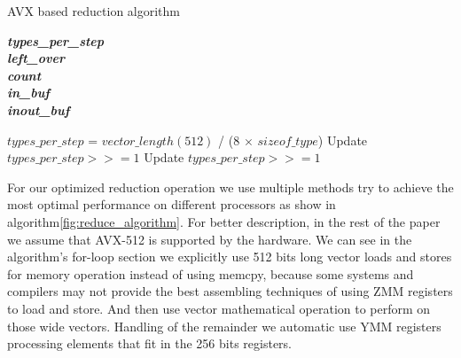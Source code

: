 \documentclass[sigconf,review]{acmart}
\begin{document}
\begin{algorithm}[t]
\caption{AVX based reduction algorithm}\label{fig:reduce_algorithm}

\textbf{\textit{types\_per\_step}} \\
\textbf{\textit{left\_over}} \\
\textbf{\textit{count}} \\
\textbf{\textit{in\_buf}} \\
\textbf{\textit{inout\_buf}} \\

\begin{algorithmic}[1]
  \State $types\_per\_step$ = $vector\_length (512)$ / ($8$ $\times$ $sizeof\_type$)
{}
\EndFor
{}
  \State Update $types\_per\_step >>= 1$
    \EndIf
\EndIf
{}
  \State Update $types\_per\_step >>= 1$
    \EndIf
\EndIf
{}
\EndIf
\EndProcedure
\end{algorithmic}
\end{algorithm}

%
For our optimized reduction operation we use multiple methods try to achieve the
most optimal performance on different processors as show in algorithm\ref{fig:reduce_algorithm}.
For better description, in the rest of the paper we assume that AVX-512 is supported by the hardware.
We can see in the algorithm's for-loop section we explicitly use 512 bits long vector loads and stores
for memory operation instead of using memcpy, because some systems and compilers
may not provide the best assembling techniques of using ZMM registers to load
and store. And then use vector mathematical operation to perform on those wide vectors.
Handling of the remainder we automatic use YMM registers processing elements that fit in the 256 bits registers.
\end{document}
